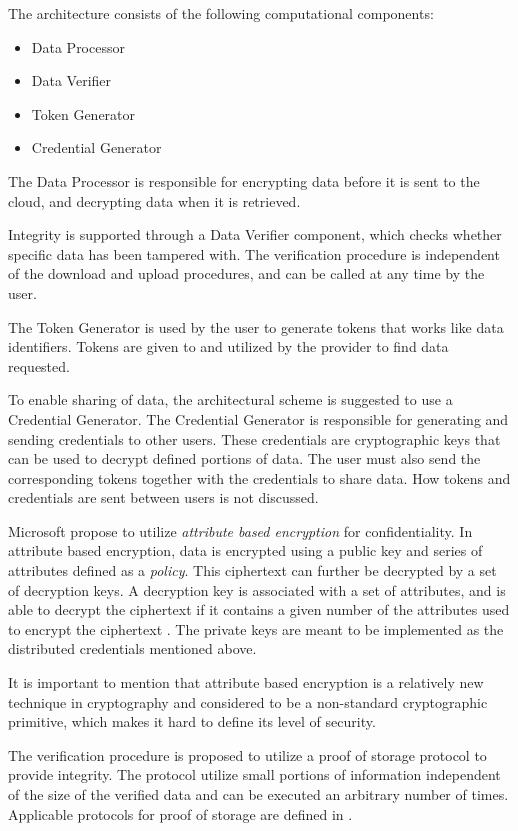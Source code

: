\documentclass[pdftex,english,10pt,b5paper,twoside]{book}
\begin{document}
The architecture consists of the following computational components:
\begin{itemize}
  \item Data Processor
  \item Data Verifier
  \item Token Generator
  \item Credential Generator
\end{itemize}

The Data Processor is responsible for encrypting data before it is sent to the
cloud, and decrypting data when it is retrieved.

Integrity is supported through a Data Verifier component, which checks whether
specific data has been tampered with. The verification procedure is independent
of the download and upload procedures, and can be called at any time by the
user.

The Token Generator is used by the user to generate tokens that works like
data identifiers. Tokens are given to and utilized by the provider to
find data requested.

To enable sharing of data, the architectural scheme is suggested to use a
Credential Generator. The Credential Generator is responsible for generating
and sending credentials to other users. These credentials are cryptographic
keys that can be used to decrypt defined portions of data. The user must also
send the corresponding tokens together with the credentials to share data. How
tokens and credentials are sent between users is not discussed.

Microsoft propose to utilize \emph{attribute based encryption} for
confidentiality. In attribute based encryption, data is encrypted using a public
key and series of attributes defined as a \emph{policy}. This ciphertext can
further be decrypted by a set of decryption keys. A decryption key is
associated with a set of attributes, and is able to decrypt the ciphertext if
it contains a given number of the attributes used to encrypt the ciphertext
\cite{microsoftresearch}. The private keys are meant to be implemented as the
distributed credentials mentioned above.

It is important to mention that attribute based encryption is a relatively new
technique in cryptography and considered to be a non-standard cryptographic
primitive, which makes it hard to define its level of security.

The verification procedure is proposed to utilize a proof of storage
protocol to provide integrity. The protocol utilize small portions of
information independent of the size of the verified data and can be executed an
arbitrary number of times. Applicable protocols for proof of storage are defined
in \cite{proofofstorage1, proofofstorage2}.
\end{document}
